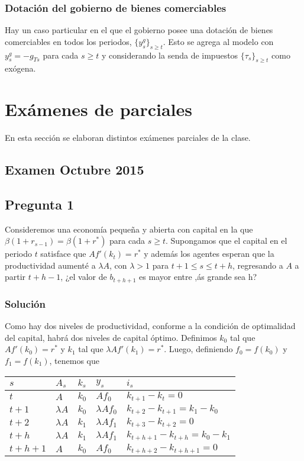 \documentclass[]{article}
\begin{document}
\subsubsection{Dotación del gobierno de bienes
comerciables}\label{dotacion-del-gobierno-de-bienes-comerciables}

Hay un caso particular en el que el gobierno posee una dotación de
bienes comerciables en todos los periodos, \(\{y_s^g\}_{s\geq t}\). Esto
se agrega al modelo con \(y_s^g = -g_{Ts}\) para cada \(s \geq t\) y
considerando la senda de impuestos \(\{\tau_s\}_{s\geq t}\) como
exógena.

\section{Exámenes de parciales}\label{examenes-de-parciales}

En esta sección se elaboran distintos exámenes parciales de la clase.

\subsection{Examen Octubre 2015}\label{examen-octubre-2015}

\subsection{Pregunta 1}\label{pregunta-1}

Consideremos una economía pequeña y abierta con capital en la que
\(\beta(1+r_{s-1}) = \beta(1+r^*)\) para cada \(s \geq t\). Supongamos
que el capital en el periodo \(t\) satisface que \(Af'(k_t) = r^*\) y
además los agentes esperan que la productividad aumenté a \(\lambda A\),
con \(\lambda > 1\) para \(t+1 \leq s \leq t+h\), regresando a \(A\) a
partir \(t + h -1\), ¿el valor de \(b_{t+h+1}\) es mayor entre ,ás
grande sea h?

\subsubsection{Solución}\label{solucion-5}

Como hay dos niveles de productividad, conforme a la condición de
optimalidad del capital, habrá dos niveles de capital óptimo. Definimos
\(k_0\) tal que \(Af'(k_0) = r^*\) y \(k_1\) tal que
\(\lambda Af'(k_1) = r^*\). Luego, definiendo \(f_0 = f(k_0)\) y
\(f_1 = f(k_1)\), tenemos que

\begin{longtable}[]{@{}lllll@{}}
\toprule
\(s\) & \(A_s\) & \(k_s\) & \(y_s\) & \(i_s\)\tabularnewline
\midrule
\endhead
\(t\) & \(A\) & \(k_0\) & \(Af_0\) & \(k_{t+1}-k_t = 0\)\tabularnewline
\(t+1\) & \(\lambda A\) & \(k_0\) & \(\lambda Af_0\) &
\(k_{t+2}-k_{t+1} = k_1 - k_0\)\tabularnewline
\(t+2\) & \(\lambda A\) & \(k_1\) & \(\lambda Af_1\) &
\(k_{t+3}-k_{t+2} = 0\)\tabularnewline
\(t+h\) & \(\lambda A\) & \(k_1\) & \(\lambda Af_1\) &
\(k_{t+h+1} - k_{t+h} = k_0 - k_1\)\tabularnewline
\(t + h + 1\) & \(A\) & \(k_0\) & \(Af_0\) &
\(k_{t+h+2}-k_{t+h+1} = 0\)\tabularnewline
\bottomrule
\end{longtable}
\end{document}
